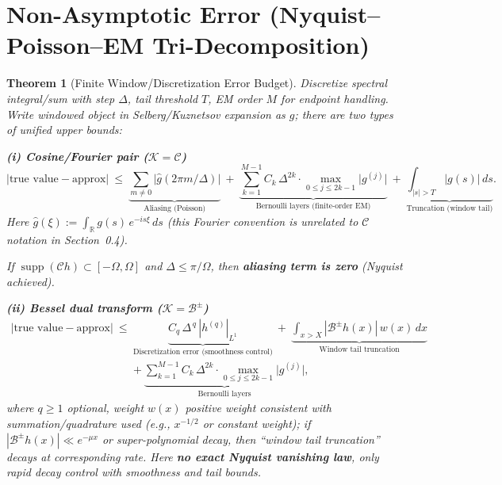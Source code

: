 \documentclass[11pt,a4paper]{article}
\newtheorem{theorem}{Theorem}[section]
\theoremstyle{remark}
\DeclareMathOperator{\supp}{supp}
\begin{document}
\section{Non-Asymptotic Error (Nyquist--Poisson--EM Tri-Decomposition)}

\begin{theorem}[Finite Window/Discretization Error Budget]\label{thm:error}
Discretize spectral integral/sum with step $\Delta$, tail threshold $T$, EM order $M$ for endpoint handling. Write windowed object in Selberg/Kuznetsov expansion as $g$; there are two types of unified upper bounds:

\textbf{(i) Cosine/Fourier pair ($\mathcal{K}=\mathcal{C}$)}
\begin{equation}
\big|\text{true value}-\text{approx}\big|
\ \le\ \underbrace{\sum_{m\ne0}\big|\widehat{g}(2\pi m/\Delta)\big|}_{\text{Aliasing (Poisson)}}
\ +\ \underbrace{\sum_{k=1}^{M-1} C_k\,\Delta^{2k}\cdot \max_{0\le j\le 2k-1} \big| g^{(j)} \big|}_{\text{Bernoulli layers (finite-order EM)}}
\ +\ \underbrace{\int_{|s|>T}|g(s)|\,ds}_{\text{Truncation (window tail)}}.
\end{equation}
Here $\widehat{g}(\xi):=\int_{\mathbb{R}} g(s)\,e^{-i s\xi}\,ds$ (this Fourier convention is unrelated to $\mathcal{C}$ notation in Section~0.4).

If $\supp(\mathcal{C} h)\subset[-\Omega,\Omega]$ and $\Delta\le \pi/\Omega$, then \textbf{aliasing term is zero} (Nyquist achieved).

\textbf{(ii) Bessel dual transform ($\mathcal{K}=\mathcal{B}^\pm$)}
\begin{equation}
\begin{aligned}
\big|\text{true value}-\text{approx}\big|
\ \le\ &\underbrace{C_q\,\Delta^{\,q}\,|h^{(q)}|_{L^1}}_{\text{Discretization error (smoothness control)}}
\ +\ \underbrace{\int_{x>X}|\mathcal{B}^\pm h(x)|\,w(x)\,dx}_{\text{Window tail truncation}}\\
&+\ \underbrace{\sum_{k=1}^{M-1} C_k\,\Delta^{2k}\cdot \max_{0\le j\le 2k-1}\big|g^{(j)}\big|}_{\text{Bernoulli layers}},
\end{aligned}
\end{equation}
where $q\ge1$ optional, weight $w(x)$ positive weight consistent with summation/quadrature used (e.g., $x^{-1/2}$ or constant weight); if $|\mathcal{B}^\pm h(x)|\ll e^{-\mu x}$ or super-polynomial decay, then ``window tail truncation'' decays at corresponding rate. Here \textbf{no exact Nyquist vanishing law}, only rapid decay control with smoothness and tail bounds.
\end{theorem}
\end{document}
